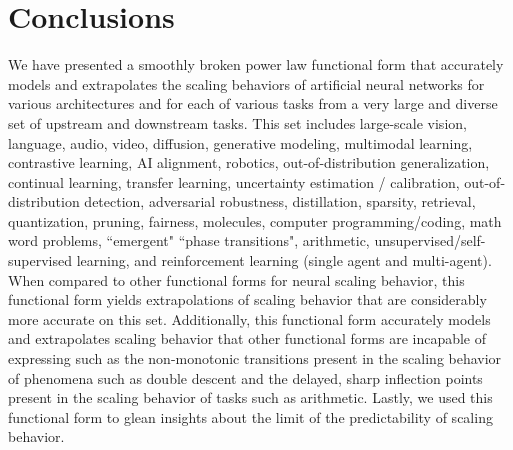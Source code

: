 \documentclass{article} %
\begin{document}
\section{Conclusions}
We have presented a smoothly broken power law functional form that accurately models and extrapolates the scaling behaviors of artificial neural networks for various architectures and for each of various tasks from a very large and diverse set of upstream and downstream tasks. This set includes large-scale vision, language, audio, video, diffusion, generative modeling, multimodal learning, contrastive learning, AI alignment, robotics, out-of-distribution generalization, continual learning, transfer learning, uncertainty estimation / calibration, out-of-distribution detection, adversarial robustness, distillation, sparsity, retrieval, quantization, pruning, fairness, molecules, computer programming/coding, math word problems, ``emergent" ``phase transitions", arithmetic, unsupervised/self-supervised learning, and reinforcement learning (single agent and multi-agent). When compared to other functional forms for neural scaling behavior, this functional form yields extrapolations of scaling behavior that are considerably more accurate on this set. Additionally, this functional form accurately models and extrapolates scaling behavior that other functional forms are incapable of expressing such as the non-monotonic transitions present in the scaling behavior of phenomena such as double descent and the delayed, sharp inflection points present in the scaling behavior of tasks such as arithmetic. Lastly, we used this functional form to glean insights about the limit of the predictability of scaling behavior.


\end{document}
